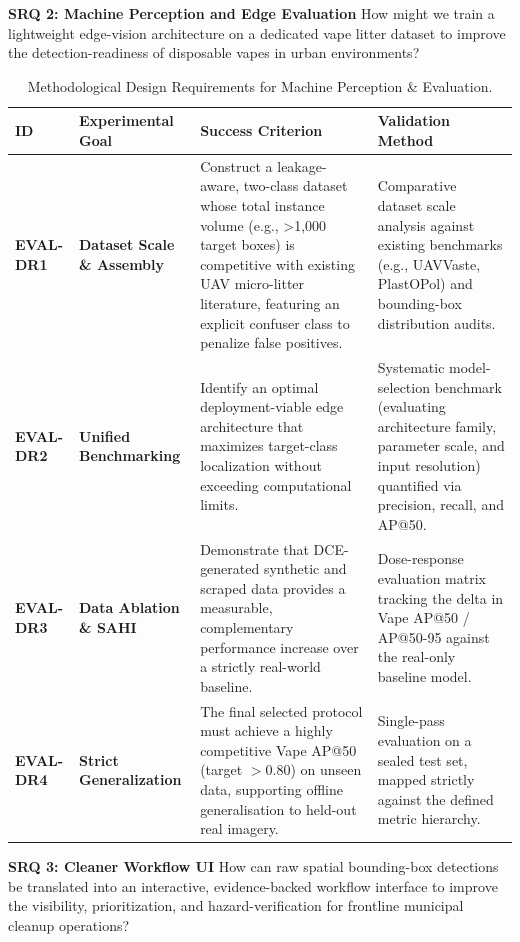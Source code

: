 \textbf{SRQ 2: Machine Perception and Edge Evaluation} 
How might we train a lightweight edge-vision architecture on a dedicated vape litter dataset to improve the detection-readiness of disposable vapes in urban environments?
\begin{table}[H]
\centering
\scriptsize
\renewcommand{\arraystretch}{1.4}
\begin{tabularx}{\textwidth}{p{} p{} X p{}}
\toprule
\textbf{ID} & \textbf{Experimental Goal} & \textbf{Success Criterion} & \textbf{Validation Method} \\
\midrule
\textbf{EVAL-DR1} & \textbf{Dataset Scale \& Assembly} & Construct a leakage-aware, two-class dataset whose total instance volume (e.g., >1,000 target boxes) is competitive with existing UAV micro-litter literature, featuring an explicit confuser class to penalize false positives. & Comparative dataset scale analysis against existing benchmarks (e.g., UAVVaste, PlastOPol) and bounding-box distribution audits. \\
\addlinespace
\textbf{EVAL-DR2} & \textbf{Unified Benchmarking} & Identify an optimal deployment-viable edge architecture that maximizes target-class localization without exceeding computational limits. & Systematic model-selection benchmark (evaluating architecture family, parameter scale, and input resolution) quantified via precision, recall, and AP@50. \\
\addlinespace
\textbf{EVAL-DR3} & \textbf{Data Ablation \& SAHI} & Demonstrate that DCE-generated synthetic and scraped data provides a measurable, complementary performance increase over a strictly real-world baseline. & Dose-response evaluation matrix tracking the delta in Vape AP@50 / AP@50-95 against the real-only baseline model. \\
\addlinespace
\textbf{EVAL-DR4} & \textbf{Strict Generalization} & The final selected protocol must achieve a highly competitive Vape AP@50 (target $> 0.80$) on unseen data, supporting offline generalisation to held-out real imagery. & Single-pass evaluation on a sealed test set, mapped strictly against the defined metric hierarchy. \\
\bottomrule
\end{tabularx}
\caption{Methodological Design Requirements for Machine Perception \& Evaluation.}
\label{tab:dr_machine_perception}
\end{table}

\textbf{SRQ 3: Cleaner Workflow UI}
How can raw spatial bounding-box detections be translated into an interactive, evidence-backed workflow interface to improve the visibility, prioritization, and hazard-verification for frontline municipal cleanup operations?

